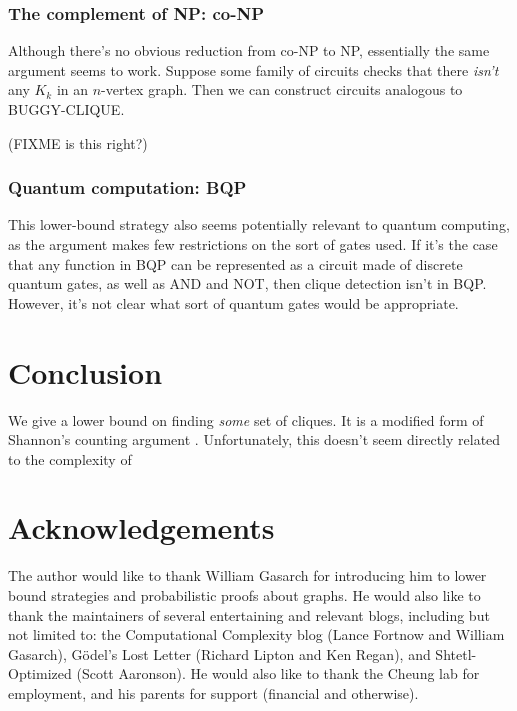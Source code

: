 \documentclass[12pt]{article}
\theoremstyle{definition}
\begin{document}
\subsubsection{The complement of NP: co-NP}

Although there's no obvious reduction from co-NP to NP, essentially
the same argument seems to work. Suppose some family of circuits
checks that there {\em isn't} any $K_k$ in an $n$-vertex graph.
Then we can construct circuits analogous to BUGGY-CLIQUE.

(FIXME is this right?)

\subsubsection{Quantum computation: BQP}

This lower-bound strategy also seems potentially
relevant to quantum computing,
as the argument makes few restrictions on the sort of gates used.
If it's the case that any function in BQP can be represented
as a circuit made of discrete quantum gates, as well as AND and NOT,
then clique detection isn't in BQP.
However, it's not clear what sort of quantum gates would be
appropriate.

\section{Conclusion}

We give a lower bound on finding {\em some} set of cliques.
It is a modified form of Shannon's counting argument
\cite{shannon_synthesis_1949}. Unfortunately,
this doesn't seem directly related to the
complexity of 

\section{Acknowledgements}

The author would like to thank William Gasarch for introducing him
to lower bound strategies and probabilistic proofs about graphs.
He would also like to thank the maintainers of
several entertaining and relevant blogs, including but
not limited to: the Computational Complexity blog
(Lance Fortnow and William Gasarch), 
G\"odel's Lost Letter (Richard Lipton and Ken Regan),
and Shtetl-Optimized (Scott Aaronson). 
He would
also like to thank the Cheung lab for
employment, and his parents for support
(financial and otherwise).



\end{document}
